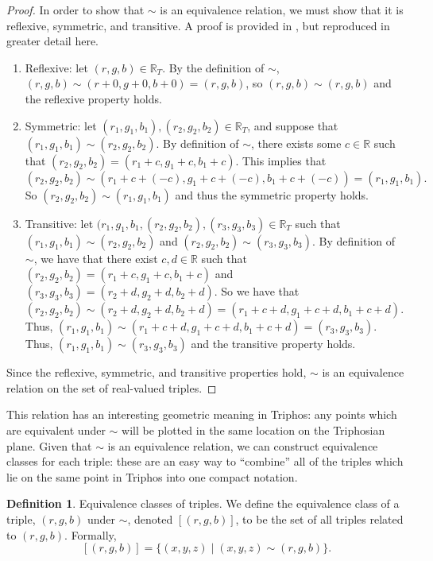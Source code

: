 \documentclass[11pt]{article}
\newcommand{\Tri}{\mathbb{R}_T}
\theoremstyle{definition}
\newtheorem{definition}{Definition}
\theoremstyle{plain}
\theoremstyle{remark}
\begin{document}
	\begin{proof}
		In order to show that \(\sim\) is an equivalence relation, we must show
		that it is reflexive, symmetric, and transitive. A proof is provided in
		\cite{egging}, but reproduced in greater detail here.
		\begin{enumerate}
			\item Reflexive: let \((r,g,b) \in \Tri.\) By the definition of
			\(\sim\), \((r,g,b) \sim (r + 0, g + 0, b + 0) = (r,g,b)\), so
			\((r,g,b) \sim (r,g,b)\) and the reflexive property holds.
			\item Symmetric: let \((r_1,g_1,b_1), (r_2,g_2,b_2) \in \Tri\), and
			suppose that \((r_1, g_1,b_1) \sim (r_2,g_2,b_2)\). By definition
			of \(\sim\), there exists some \(c \in \mathbb{R}\) such that
			\((r_2, g_2, b_2) = (r_1 + c, g_1 + c, b_1 +c)\). This implies that
			\((r_2, g_2, b_2) \sim (r_1 + c + (-c), g_1 + c + (-c), b_1 +c +
			(-c)) = (r_1,g_1,b_1).\) So \((r_2,g_2,b_2) \sim (r_1,g_1,b_1)\)
			and thus the symmetric property holds.
			\item Transitive: let \((r_1,g_1,b_1, (r_2,g_2,b_2), (r_3,g_3,b_3)
			\in \Tri\) such that \((r_1,g_1,b_1) \sim (r_2,g_2,b_2)\) and
			\((r_2,g_2,b_2) \sim (r_3,g_3,b_3)\). By definition of \(\sim\), we
			have that there exist \(c,d \in \mathbb{R}\) such that
			\((r_2,g_2,b_2) = (r_1 + c,g_1 + c,b_1 + c)\) and \((r_3,g_3,b_3) =
			(r_2 + d,g_2 + d,b_2 + d)\). So we have that \((r_2,g_2,b_2) \sim
			(r_2 + d,g_2 + d,b_2 + d) = (r_1 + c + d, g_1 + c + d, b_1 + c +
			d)\). Thus, \((r_1, g_1, b_1) \sim (r_1 + c + d, g_1 + c + d, b_1 +
			c + d) = (r_3, g_3, b_3).\) Thus, \((r_1,g_1,b_1) \sim
			(r_3,g_3,b_3)\) and the transitive property holds.
		\end{enumerate}
		Since the reflexive, symmetric, and transitive properties hold,
		\(\sim\) is an equivalence relation on the set of real-valued triples.
	\end{proof}

	This relation has an interesting geometric meaning in Triphos: any points
	which are equivalent under \(\sim\) will be plotted in the same location on
	the Triphosian plane. Given that \(\sim\) is an equivalence relation, we
	can construct equivalence classes for each triple: these are an easy way to
	``combine'' all of the triples which lie on the same point in Triphos into
	one compact notation.

	\begin{definition}{Equivalence classes of triples.}
		We define the equivalence class of a triple, \((r,g,b)\) under
		\(\sim\), denoted \([(r,g,b)]\), to be the set of all triples related
		to \((r,g,b)\). Formally,
		\[[(r,g,b)] = \{(x,y,z) \mid (x,y,z)\sim(r,g,b)\}.\]
	\end{definition}
\end{document}
